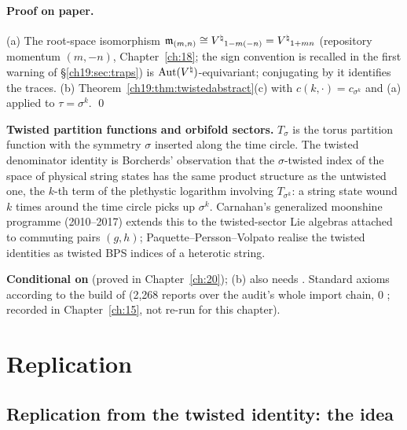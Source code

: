\paragraph{Proof on paper.}  (a) The root-space isomorphism $\mathfrak{m}_{(m,n)}\cong{V^{\natural}}_{1-m(-n)}={V^{\natural}}_{1+mn}$ (repository momentum
$(m,-n)$, Chapter~\ref{ch:18}; the sign convention is recalled in the first warning of \S\ref{ch19:sec:traps}) is $\operatorname{Aut}({V^{\natural}})$-equivariant; conjugating by it identifies the traces.  (b)
Theorem~\ref{ch19:thm:twistedabstract}(c) with $c(k,\cdot)=c_{\sigma^k}$ and (a) applied to $\tau=\sigma^k$. \qed
\begin{physics}
\textbf{Twisted partition functions and orbifold sectors.}  $T_{\sigma}$ is the torus partition function with the symmetry
$\sigma$ inserted along the time circle.  The twisted denominator identity is Borcherds' observation that the
$\sigma$-twisted index of the space of physical string states has the same product structure as the untwisted one, the
$k$-th term of the plethystic logarithm involving $T_{\sigma^k}$: a string state wound $k$ times around the time circle
picks up $\sigma^k$.  Carnahan's generalized moonshine programme (2010--2017) extends this to the twisted-sector
Lie algebras attached to commuting pairs $(g,h)$; Paquette--Persson--Volpato realise the twisted identities as twisted BPS
indices of a heterotic string.
\end{physics}
\begin{status}
\textbf{Conditional on}  (proved in Chapter~\ref{ch:20}); (b) also needs
.  Standard axioms according to the build of  (2,268 reports over the audit's whole import chain, 0 ; recorded in
Chapter~\ref{ch:15}, not re-run for this chapter).
\end{status}

\section{Replication}\label{ch19:sec:replication}

\subsection{Replication from the twisted identity: the idea}

